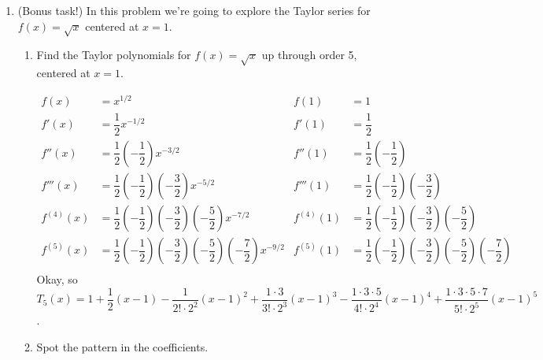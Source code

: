 \begin{enumerate}[leftmargin=0pt]
\item (Bonus task!) In this problem we're going to explore the Taylor series for $f(x) = \sqrt{x}$ centered at $x = 1$.
\begin{enumerate}
    \item Find the Taylor polynomials for $f(x) = \sqrt{x}$ up through order 5, centered at $x=1$.
    \begin{red}
        \begin{align*}
            f(x) &= x^{1/2} 
            & f(1) &= 1 \\
            f'(x) &= \dfrac{1}{2} x^{-1/2} 
            &f'(1) &= \dfrac{1}{2} \\
            f''(x) &= \dfrac{1}{2}\left( -\dfrac{1}{2}\right) x^{-3/2} 
            & f''(1) &= \dfrac{1}{2}\left( -\dfrac{1}{2}\right) \\
            f'''(x) &= \dfrac{1}{2}
            \left( -\dfrac{1}{2}\right)
            \left( -\dfrac{3}{2}\right) 
            x^{-5/2} 
            & f'''(1) &= \dfrac{1}{2}
            \left( -\dfrac{1}{2}\right)
            \left( -\dfrac{3}{2}\right)  \\
            f^{(4)}(x) &= \dfrac{1}{2}
            \left( -\dfrac{1}{2}\right)
            \left( -\dfrac{3}{2}\right)
            \left( -\dfrac{5}{2}\right)
            x^{-7/2}
            & f^{(4)}(1) &= \dfrac{1}{2}
            \left( -\dfrac{1}{2}\right)
            \left( -\dfrac{3}{2}\right)
            \left( -\dfrac{5}{2}\right) \\
            f^{(5)}(x) &= \dfrac{1}{2}
            \left( -\dfrac{1}{2}\right)
            \left( -\dfrac{3}{2}\right)
            \left( -\dfrac{5}{2}\right)
            \left( -\dfrac{7}{2}\right)
            x^{-9/2}
            & f^{(5)}(1) &= \dfrac{1}{2}
            \left( -\dfrac{1}{2}\right)
            \left( -\dfrac{3}{2}\right)
            \left( -\dfrac{5}{2}\right)
            \left( -\dfrac{7}{2}\right) \\
        \end{align*}
        Okay, so $T_5(x) = 1 
        + \dfrac12 (x-1) 
        - \dfrac{1}{2!\cdot 2^2}(x-1)^2
        + \dfrac{1\cdot 3}{3!\cdot 2^3}(x-1)^3 
        - \dfrac{1\cdot3 \cdot 5}{4!\cdot 2^4}(x-1)^4
        + \dfrac{1\cdot3 \cdot 5\cdot 7}{5!\cdot 2^5}(x-1)^5$.
    \end{red}
    \item Spot the pattern in the coefficients.


\end{enumerate}
\end{enumerate}
